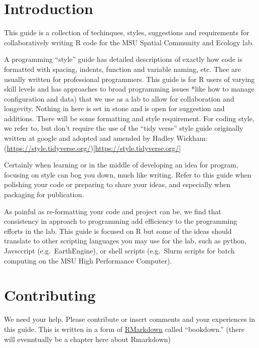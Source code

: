 \documentclass[
]{article}
\author{}
\date{\vspace{-2.5em}}
\begin{document}
{
\setcounter{tocdepth}{2}
\tableofcontents
}
\hypertarget{intro}{%
\section{Introduction}\label{intro}}

This guide is a collection of techinques, styles, suggestions and requirements for collaboratively writing R code for the MSU Spatial Community and Ecology lab.

A programming ``style'' guide has detailed descriptions of exactly how code is formatted with spacing, indents, function and variable naming, etc. Thee are usually written for professional programmers. This guide is for R users of varying skill levels and has approaches to broad programming issues *like how to manage configuration and data) that we use as a lab to allow for collaboration and longevity. Nothing in here is set in stone and is open for suggestion and additions. There will be some formatting and style requirement. For coding style, we refer to, but don't require the use of the ``tidy verse'' style guide originally written at google and adopted and amended by Hadley Wickham: (\url{https://style.tidyverse.org/}){[}\url{https://style.tidyverse.org/}{]}

Certainly when learning or in the middle of developing an idea for program, focusing on style can bog you down, much like writing. Refer to this guide when polishing your code or preparing to share your ideas, and especially when packaging for publication.

As painful as re-formatting your code and project can be, we find that consistency in approach to programming add efficiency to the programming efforts in the lab. This guide is focused on R but some of the ideas should translate to other scripting languages you may use for the lab, such as python, Javsccript (e.g.~EarthEngine), or shell scripts (e.g.~Slurm scripts for batch computing on the MSU High Performance Computer).

\hypertarget{contributing}{%
\section{Contributing}\label{contributing}}

We need your help. Please contribute or insert comments and your experiences in this guide. This is written in a form of \href{https://r4ds.had.co.nz/r-markdown.html}{RMarkdown} called ``bookdown.'' (there will evenntually be a chapter here about Rmarkdown)
\end{document}

